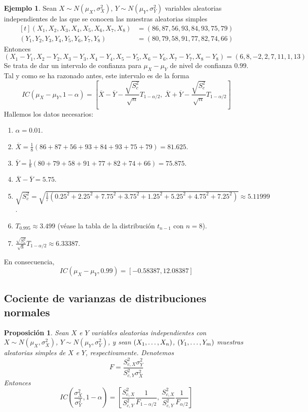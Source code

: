 \documentclass[11pt]{report}
\newtheorem{proposition}{Proposición}
\theoremstyle{definition}
\newtheorem{example}{Ejemplo}
\newcommand{\pars}[1]{\left( #1 \right)}
\begin{document}
\begin{example}
Sean $X \sim N(\mu_X,\sigma^2_X)$, $Y \sim N(\mu_Y,\sigma^2_Y)$ variables aleatorias independientes de las que se conocen las muestras aleatorias simples
\[\begin{aligned}[t]
(X_1,X_2,X_3,X_4,X_5,X_6,X_7,X_8) &= (86,87,56,93,84,93,75,79) \\
(Y_1,Y_2,Y_3,Y_4,Y_5,Y_6,Y_7,Y_8) &= (80,79,58,91,77,82,74,66)
\end{aligned}
\]
Entonces
\[(X_1-Y_1,X_2-Y_2,X_3-Y_3,X_4-Y_4,X_5-Y_5,X_6-Y_6,X_7-Y_7,X_8-Y_8)=(6,8,-2,2,7,11,1,13)\]
Se trata de dar un intervalo de confianza para $\mu_X- \mu_Y$ de nivel de confianza $0.99$. Tal y como se ha razonado antes, este intervalo es de la forma
\[IC(\mu_X-\mu_Y,1-\alpha) = \left[\overline{X}-\overline{Y}-\frac{\sqrt{S^2_c}}{\sqrt{n}}T_{1-\alpha/2}, \ \overline{X}+\overline{Y}-\frac{\sqrt{S^2_c}}{\sqrt{n}}T_{1-\alpha/2}\right]\]
Hallemos los datos necesarios:
\begin{enumerate}
    \item $\alpha=0.01$.
    \item $\displaystyle\overline{X} = \frac{1}{8}\pars{86+87+56+93+84+93+75+79} = 81.625$.
    \item $\displaystyle\overline{Y} = \frac{1}{8}\pars{80+79+58+91+77+82+74+66} = 75.875$.
    \item $\overline{X}-\overline{Y} = 5.75.$
    \item $\displaystyle\sqrt{S^2_c} = \sqrt{\frac{1}{7}\pars{0.25^2+2.25^2+7.75^2+3.75^2+1.25^2+5.25^2+4.75^2+7.25^2}} \approx 5.11999$.
    \item $T_{0.995} \approx 3.499$ (véase la tabla de la distribución $t_{n-1}$ con $n = 8$).
    \item $\frac{\sqrt{S^2_c}}{\sqrt{8}}T_{1-\alpha/2} \approx 6.33387$.
\end{enumerate}
En consecuencia,
\[IC(\mu_X-\mu_Y, 0.99) = \left[-0.58387,12.08387\right]\]
\end{example}

\subsection{Cociente de varianzas de distribuciones normales}

\begin{proposition}
Sean $X$ e $Y$ variables aleatorias independientes con $X \sim N(\mu_X,\sigma^2_X)$, $Y \sim N(\mu_Y,\sigma^2_Y)$, y sean $(X_1,\mathellipsis,X_n)$, $(Y_1,\mathellipsis,Y_m)$ muestras aleatorias simples de $X$ e $Y$, respectivamente. Denotemos
\[F = \frac{S^2_{c,X}\sigma^2_Y}{S^2_{c,Y}\sigma^2_X}\]
Entonces
\[IC\left(\frac{\sigma^2_X}{\sigma^2_Y},1-\alpha\right) = \left[\frac{S^2_{c,X}}{S^2_{c,Y}} \frac{1}{F_{1-\alpha/2}}, \, \frac{S^2_{c,X}}{S^2_{c,Y}} \frac{1}{F_{\alpha/2}}\right]\]
\end{proposition}
\end{document}
